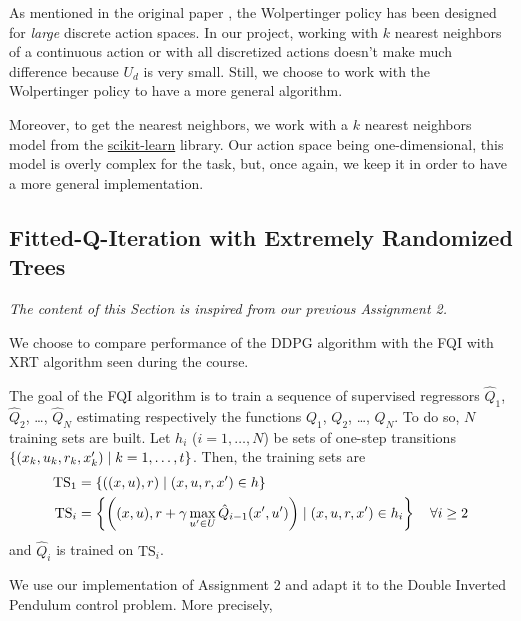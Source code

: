 \documentclass[a4paper, 12pt]{article}
\begin{document}
    \begin{note}
        As mentioned in the original paper \cite{dulac2015deep}, the Wolpertinger policy has been designed for \emph{large} discrete action spaces. In our project, working with $k$ nearest neighbors of a continuous action or with all discretized actions doesn't make much difference because $U_d$ is very small. Still, we choose to work with the Wolpertinger policy to have a more general algorithm.
        
        Moreover, to get the nearest neighbors, we work with a $k$ nearest neighbors model from the \href{https://scikit-learn.org/}{scikit-learn} library. Our action space being one-dimensional, this model is overly complex for the task, but, once again, we keep it in order to have a more general implementation.
    \end{note}
    
    \subsection{Fitted-Q-Iteration with Extremely Randomized Trees}
    
    \emph{The content of this Section is inspired from our previous Assignment 2.}
    
    We choose to compare performance of the DDPG algorithm with the FQI with XRT algorithm seen during the course.
    
    The goal of the FQI algorithm is to train a sequence of supervised regressors $\hat{Q}_1$, $\hat{Q}_2$, \dots, $\hat{Q}_N$ estimating respectively the functions $Q_1$, $Q_2$, \dots, $Q_N$. To do so, $N$ training sets are built. Let $h_i$ ($i = 1, \ldots, N$) be sets of one-step transitions $\left\{(x_k, u_k, r_k, x'_k) \mid k = 1, \ldots, t\right\}$. Then, the training sets are
    \begin{align*}
        \text{TS}_1 & = \left\{\left((x, u), r\right) \mid (x, u, r, x') \in h\right\} \\
        \text{TS}_i & = \left\{\left((x, u), r + \gamma \max _{u' \in U} \hat{Q}_{i - 1}(x', u')\right) \mid (x, u, r, x') \in h_i \right\} \quad \forall i \geq 2
    \end{align*}
    and $\hat{Q}_i$ is trained on $\text{TS}_i$.
    
    We use our implementation of Assignment 2 and adapt it to the Double Inverted Pendulum control problem. More precisely,
    
\end{document}
